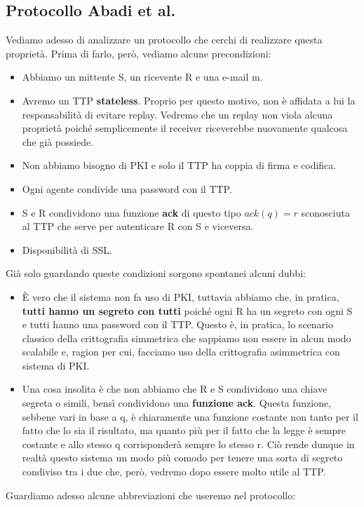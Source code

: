 \subsection{Protocollo Abadi et al.}
Vediamo adesso di analizzare un protocollo che cerchi di realizzare questa proprietà. Prima di farlo, però, vediamo alcune precondizioni:
\begin{itemize}
    \item Abbiamo un mittente S, un ricevente R e una e-mail m.
    \item Avremo un TTP \textbf{stateless}. Proprio per questo motivo, non è affidata a lui la responsabilità di evitare replay. Vedremo che un replay non viola alcuna proprietà poiché semplicemente il receiver riceverebbe nuovamente qualcosa che già possiede.
    \item Non abbiamo bisogno di PKI e solo il TTP ha coppia di firma e codifica.
    \item Ogni agente condivide una password con il TTP.
    \item S e R condividono una funzione \textbf{ack} di questo tipo $ack(q) = r$ sconosciuta al TTP che serve per autenticare R con S e viceversa.
    \item Disponibilità di SSL.
\end{itemize}
Già solo guardando queste condizioni sorgono spontanei alcuni dubbi:
\begin{itemize}
    \item È vero che il sistema non fa uso di PKI, tuttavia abbiamo che, in pratica, \textbf{tutti hanno un segreto con tutti} poiché ogni R ha un segreto con ogni S e tutti hanno una password con il TTP. Questo è, in pratica, lo scenario classico della crittografia simmetrica che sappiamo non essere in alcun modo scalabile e, ragion per cui, facciamo uso della crittografia asimmetrica con sistema di PKI.
    \item Una cosa insolita è che non abbiamo che R e S condividono una chiave segreta o simili, bensì condividono una \textbf{funzione ack}. Questa funzione, sebbene vari in base a q, è chiaramente una funzione costante non tanto per il fatto che lo sia il risultato, ma quanto più per il fatto che la legge è sempre costante e allo stesso q corrisponderà sempre lo stesso r. Ciò rende dunque in realtà questo sistema un modo più comodo per tenere una sorta di segreto condiviso tra i due che, però, vedremo dopo essere molto utile al TTP.
\end{itemize}
Guardiamo adesso alcune abbreviazioni che useremo nel protocollo:
